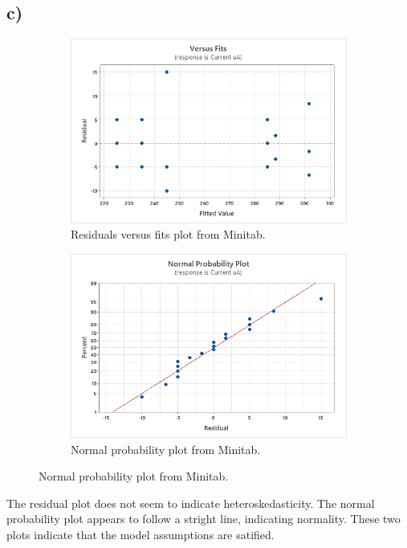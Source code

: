 \documentclass{article}
\begin{document}
\clearpage
\subsection*{c)}
\begin{figure}[h]
    \centering
    \begin{subfigure}[b]{0.45\textwidth}
        \includegraphics[width=1\textwidth]{./images/3_c_1.png}
        \caption{Residuals versus fits plot from Minitab.}
      \label{fig:img11}
    \end{subfigure}
    \hfill
    \begin{subfigure}[b]{0.45\textwidth}
        \includegraphics[width=1\textwidth]{./images/3_c_2.png}
        \caption{Normal probability plot from Minitab.}
      \label{fig:img22}
    \end{subfigure}
    \label{fig:both}
\end{figure}
The residual plot does not seem to indicate heteroskedasticity. The normal probability plot appears to follow a stright line, indicating normality.
These two plots indicate that the model assumptions are satified.
\end{document}
